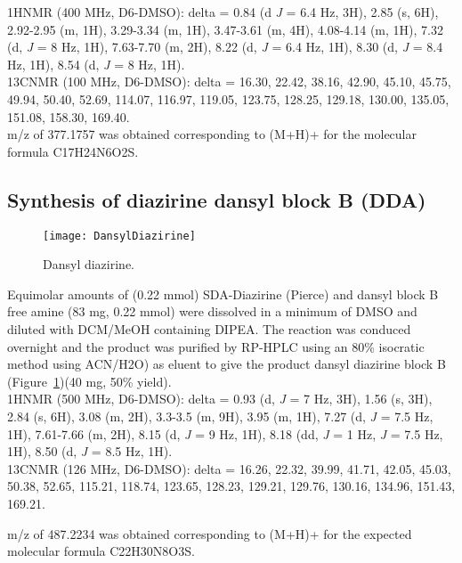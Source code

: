 \noindent
1HNMR (400 MHz, D6-DMSO): delta = 0.84 (d {\it J} = 6.4 Hz, 3H), 2.85 (s, 6H), 2.92-2.95 (m, 1H), 3.29-3.34 (m, 1H), 3.47-3.61 (m, 4H), 4.08-4.14 (m, 1H), 7.32 (d, {\it J} = 8 Hz, 1H), 7.63-7.70 (m, 2H), 8.22 (d, {\it J} = 6.4 Hz, 1H), 8.30 (d, {\it J} = 8.4 Hz, 1H), 8.54 (d, {\it J} = 8 Hz, 1H). \\

\noindent
13CNMR (100 MHz, D6-DMSO): delta = 16.30, 22.42, 38.16, 42.90, 45.10, 45.75, 49.94, 50.40, 52.69, 114.07, 116.97, 119.05, 123.75, 128.25, 129.18, 130.00, 135.05, 151.08, 158.30, 169.40. \\

\noindent
m/z of 377.1757 was obtained corresponding to (M+H)+ for the molecular formula C17H24N6O2S. \

\clearpage

\subsection{Synthesis of diazirine dansyl block B (DDA)}

\begin{figure}
\centering
\texttt{[image: DansylDiazirine]}
\caption{Dansyl diazirine.}
\label{fig:DansylDiazirineSynth}
\end{figure}

Equimolar amounts of (0.22 mmol) SDA-Diazirine (Pierce) and dansyl block B free amine (83 mg, 0.22 mmol) were dissolved in a minimum of DMSO and diluted with DCM/MeOH containing DIPEA. The reaction was conduced overnight and the product was purified by RP-HPLC using an 80{\%} isocratic method using ACN/H2O) as eluent to give the product dansyl diazirine block B (Figure~\ref{fig:DansylDiazirineSynth})(40 mg, 50{\%} yield). \\

\noindent
1HNMR (500 MHz, D6-DMSO): delta = 0.93 (d, {\it J} = 7 Hz, 3H), 1.56 (s, 3H), 2.84 (s, 6H), 3.08 (m, 2H), 3.3-3.5 (m, 9H), 3.95 (m, 1H), 7.27 (d, {\it J} = 7.5 Hz, 1H), 7.61-7.66 (m, 2H), 8.15 (d, {\it J} = 9 Hz, 1H), 8.18 (dd, {\it J} = 1 Hz, {\it J} = 7.5 Hz, 1H), 8.50 (d, {\it J} = 8.5 Hz, 1H). \\

\noindent
13CNMR (126 MHz, D6-DMSO): delta = 16.26, 22.32, 39.99, 41.71, 42.05, 45.03, 50.38, 52.65, 115.21, 118.74, 123.65, 128.23, 129.21, 129.76, 130.16, 134.96, 151.43, 169.21. \

\noindent
m/z of 487.2234 was obtained corresponding to (M+H)+ for the expected molecular formula C22H30N8O3S. 

